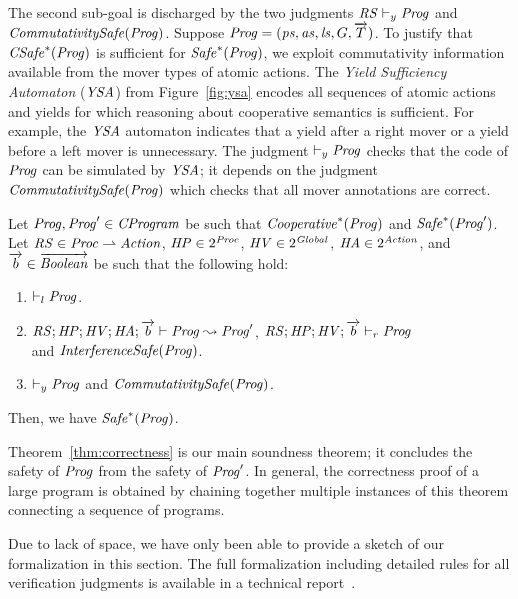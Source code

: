 The second sub-goal is discharged by the two judgments $\mathit{RS} \vdash_y \mathit{Prog}$ and $\mathit{CommutativitySafe}(\mathit{Prog})$.
Suppose $\mathit{Prog} = (\mathit{ps}, \mathit{as}, \mathit{ls}, G, \overrightarrow{T})$.
To justify that $\mathit{CSafe}^*(\mathit{Prog})$ is sufficient for $\mathit{Safe}^*(\mathit{Prog})$,
we exploit commutativity information available from the mover types of atomic actions.
The {\em Yield Sufficiency Automaton\/} ($\mathit{YSA}$) from Figure~\ref{fig:ysa} encodes 
all sequences of atomic actions and yields for which reasoning about cooperative semantics is sufficient.
For example, the $\mathit{YSA}$ automaton indicates that a yield after a right mover or a yield before a left mover is unnecessary.
The judgment $\vdash_y \mathit{Prog}$ checks that the code of $\mathit{Prog}$ can be simulated by $\mathit{YSA}$;
it depends on the judgment $\mathit{CommutativitySafe}(\mathit{Prog})$ which checks that all mover annotations are correct.

\begin{theorem}
\label{thm:correctness}
Let $\mathit{Prog},\mathit{Prog}' \in \mathit{CProgram}$ be such that $\mathit{Cooperative}^*(\mathit{Prog})$ and $\mathit{Safe}^*(\mathit{Prog}')$.
Let $\mathit{RS} \in \mathit{Proc} \rightharpoonup \mathit{Action}$, $\mathit{HP} \in 2^{\mathit{Proc}}$, 
$\mathit{HV} \in 2^{\mathit{Global}}$, $\mathit{HA} \in 2^{\mathit{Action}}$,
and $\overrightarrow{b} \in \overrightarrow{\mathit{Boolean}}$ be such that the following hold:
\begin{enumerate}
\item
$\vdash_l \mathit{Prog}$.
\item
$\mathit{RS};\mathit{HP};\mathit{HV};\mathit{HA};\overrightarrow{b} \vdash \mathit{Prog} \leadsto \mathit{Prog}'$,
$\mathit{RS};\mathit{HP};\mathit{HV};\overrightarrow{b} \vdash_r \mathit{Prog}$ \\ and $\mathit{InterferenceSafe}(\mathit{Prog})$.
\item
$\vdash_y \mathit{Prog}$ and $\mathit{CommutativitySafe}(\mathit{Prog})$.
\end{enumerate}
Then, we have $\mathit{Safe}^*(\mathit{Prog})$.
\end{theorem}

Theorem~\ref{thm:correctness} is our main soundness theorem;
it concludes the safety of $\mathit{Prog}$ from the safety of $\mathit{Prog}'$.
In general, the correctness proof of a large program is obtained by chaining together
multiple instances of this theorem connecting a sequence of programs.  

Due to lack of space, we have only been able to provide a sketch of our formalization in this section.
The full formalization including detailed rules for all verification judgments is available in a technical report~\cite{gc-techreport}.
